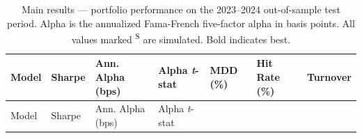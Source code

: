 \documentclass[
  11pt,
  a4paper,
]{article}
\begin{document}
\begin{longtable}[]{@{}
  >{\raggedright\arraybackslash}p{}
  >{\centering\arraybackslash}p{}
  >{\centering\arraybackslash}p{}
  >{\centering\arraybackslash}p{}
  >{\centering\arraybackslash}p{}
  >{\centering\arraybackslash}p{}
  >{\centering\arraybackslash}p{}@{}}
\caption{Main results --- portfolio performance on the 2023--2024
out-of-sample test period. Alpha is the annualized Fama-French
five-factor alpha in basis points. All values marked \textsuperscript{S}
are simulated. Bold indicates best.}\label{tbl-main}\tabularnewline
\toprule\noalign{}
\begin{minipage}[b]{\linewidth}\raggedright
Model
\end{minipage} & \begin{minipage}[b]{\linewidth}\centering
Sharpe
\end{minipage} & \begin{minipage}[b]{\linewidth}\centering
Ann. Alpha (bps)
\end{minipage} & \begin{minipage}[b]{\linewidth}\centering
Alpha \emph{t}-stat
\end{minipage} & \begin{minipage}[b]{\linewidth}\centering
MDD (\%)
\end{minipage} & \begin{minipage}[b]{\linewidth}\centering
Hit Rate (\%)
\end{minipage} & \begin{minipage}[b]{\linewidth}\centering
Turnover
\end{minipage} \\
\midrule\noalign{}
\endfirsthead
\toprule\noalign{}
\begin{minipage}[b]{\linewidth}\raggedright
Model
\end{minipage} & \begin{minipage}[b]{\linewidth}\centering
Sharpe
\end{minipage} & \begin{minipage}[b]{\linewidth}\centering
Ann. Alpha (bps)
\end{minipage} & \begin{minipage}[b]{\linewidth}\centering
Alpha \emph{t}-stat
\end{minipage} & \begin{minipage}[b]{\linewidth}\centering

\end{minipage}
\end{longtable}
\end{document}
